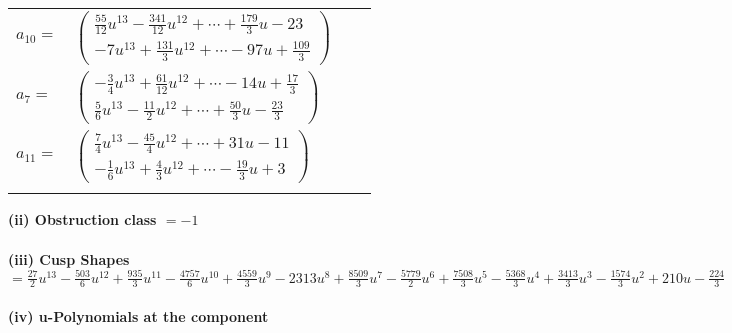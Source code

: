 \documentclass[1p]{elsarticle_modified}
\theoremstyle{definition}
\begin{document}
\begin{tabular}{m{7pt} m{180pt} m{7pt} m{180pt} }
\flushright $a_{10}=$&$\begin{pmatrix}\frac{55}{12} u^{13}-\frac{341}{12} u^{12}+\cdots+\frac{179}{3} u-23\\-7 u^{13}+\frac{131}{3} u^{12}+\cdots-97 u+\frac{109}{3}\end{pmatrix}$ \\
\flushright $a_{7}=$&$\begin{pmatrix}-\frac{3}{4} u^{13}+\frac{61}{12} u^{12}+\cdots-14 u+\frac{17}{3}\\\frac{5}{6} u^{13}-\frac{11}{2} u^{12}+\cdots+\frac{50}{3} u-\frac{23}{3}\end{pmatrix}$ \\
\flushright $a_{11}=$&$\begin{pmatrix}\frac{7}{4} u^{13}-\frac{45}{4} u^{12}+\cdots+31 u-11\\-\frac{1}{6} u^{13}+\frac{4}{3} u^{12}+\cdots-\frac{19}{3} u+3\end{pmatrix}$\\&\end{tabular}
\flushleft \textbf{(ii) Obstruction class $= -1$}\\~\\
\flushleft \textbf{(iii) Cusp Shapes $= \frac{27}{2} u^{13}-\frac{503}{6} u^{12}+\frac{935}{3} u^{11}-\frac{4757}{6} u^{10}+\frac{4559}{3} u^9-2313 u^8+\frac{8509}{3} u^7-\frac{5779}{2} u^6+\frac{7508}{3} u^5-\frac{5368}{3} u^4+\frac{3413}{3} u^3-\frac{1574}{3} u^2+210 u-\frac{224}{3}$}\\~\\
\newpage\renewcommand{\arraystretch}{1}
\flushleft \textbf{(iv) u-Polynomials at the component}\newline \\
\end{document}
